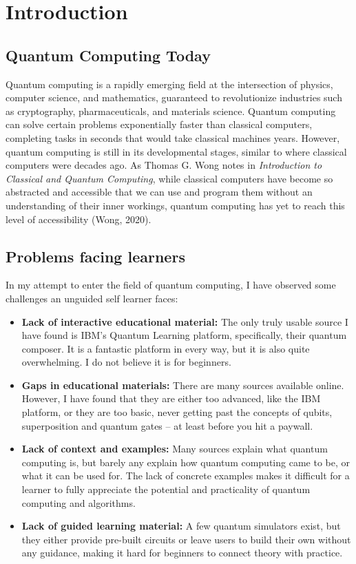 \chapter{Introduction }
\label{chap:Introduction}
\section{Quantum Computing Today}

Quantum computing is a rapidly emerging field at the intersection of physics, computer science, and mathematics, guaranteed to revolutionize industries such as cryptography, pharmaceuticals, and materials science. Quantum computing can solve certain problems exponentially faster than classical computers, completing tasks in seconds that would take classical machines years. However, quantum computing is still in its developmental stages, similar to where classical computers were decades ago. As Thomas G. Wong notes in \textit{Introduction to Classical and Quantum Computing}, while classical computers have become so abstracted and accessible that we can use and program them without an understanding of their inner workings, quantum computing has yet to reach this level of accessibility (Wong, 2020).
    


\section{Problems facing learners}
In my attempt to enter the field of quantum computing, I have observed some challenges an unguided self learner faces: 
\begin{itemize}
    \item \textbf{Lack of interactive educational material:} The only truly usable source I have found is IBM's Quantum Learning platform, specifically, their quantum composer. It is a fantastic platform in every way, but it is also quite overwhelming. I do not believe it is for beginners. 
    \item \textbf{Gaps in educational materials:} There are many sources available online. However, I have found that they are either too advanced, like the IBM platform, or they are too basic, never getting past the concepts of qubits, superposition and quantum gates -- at least before you hit a paywall. 
    \item \textbf{Lack of context and examples:} Many sources explain what quantum computing is, but  barely any explain how quantum computing came to be, or what it can be used for. The lack of concrete examples makes it difficult for a learner to fully appreciate the potential and practicality of quantum computing and algorithms.
    \item \textbf{Lack of guided learning material:} A few quantum simulators exist, but they either provide pre-built circuits or leave users to build their own without any guidance, making it hard for beginners to connect theory with practice.
    
\end{itemize}


\vspace{0.5cm}
